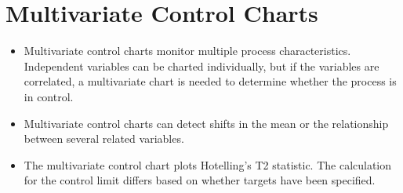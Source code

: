 \documentclass[]{article}
\begin{document}
\section{Multivariate Control Charts}
{\large\begin{itemize}
\item Multivariate control charts monitor multiple process characteristics. Independent variables can be charted individually, but if the variables are correlated, a multivariate chart is needed to determine whether the process is in control. 
\item Multivariate control charts can detect shifts in the mean or the relationship between several related variables.
\item 
The multivariate control chart plots Hotelling’s T2 statistic. The calculation for the control limit differs based on whether targets have been specified.
\end{itemize}}
\newpage
\end{document}

